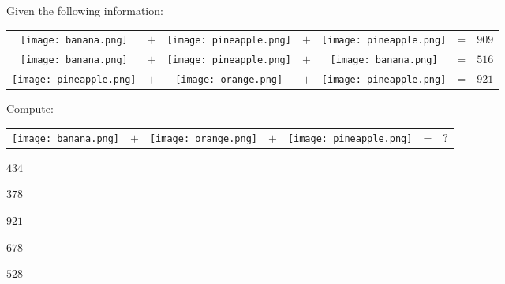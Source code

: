 

\begin{question}
Given the following information:
\begin{center}
\begin{tabular}{ccccccr}
\texttt{[image: banana.png]} & $+$ & \texttt{[image: pineapple.png]} & $+$ & \texttt{[image: pineapple.png]} & = & $909$ \\
\texttt{[image: banana.png]} & $+$ & \texttt{[image: pineapple.png]} & $+$ & \texttt{[image: banana.png]} & = & $516$ \\
\texttt{[image: pineapple.png]} & $+$ & \texttt{[image: orange.png]} & $+$ & \texttt{[image: pineapple.png]} & = & $921$
\end{tabular}
\end{center}

Compute:
\begin{center}
\begin{tabular}{ccccccr}
\texttt{[image: banana.png]} & $+$ & \texttt{[image: orange.png]} & $+$ & \texttt{[image: pineapple.png]} & = & $\text{?}$
\end{tabular}
\end{center}

\begin{answerlist}
  \item $434$
  \item $378$
  \item $921$
  \item $678$
  \item $528$
\end{answerlist}\end{question}

